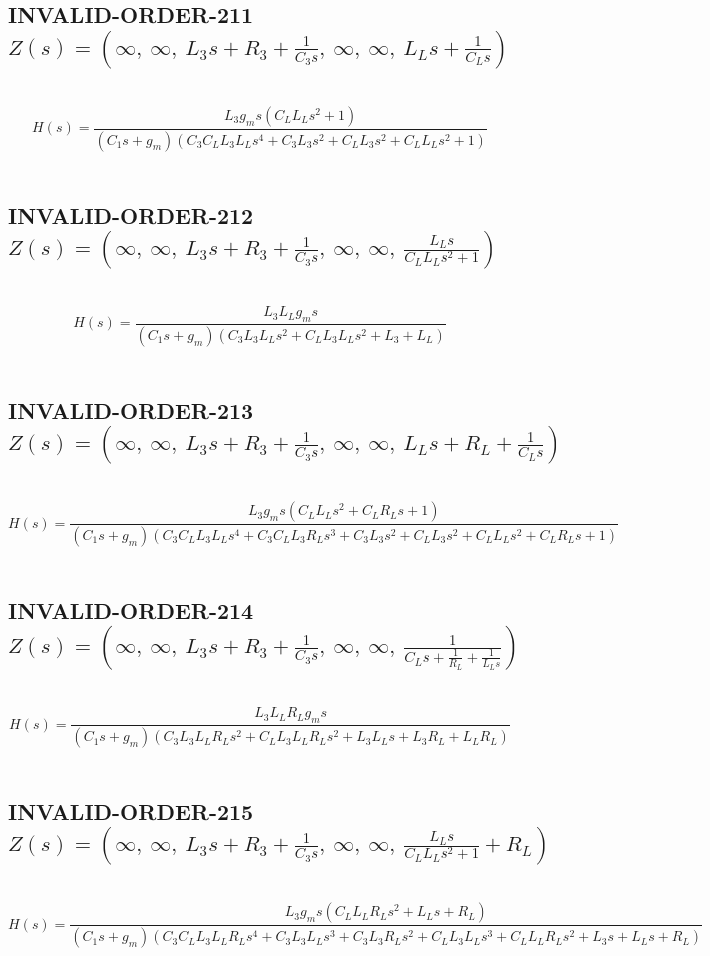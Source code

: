 \documentclass{article}
\begin{document}
\subsection{INVALID-ORDER-211 $Z(s) = \left( \infty, \  \infty, \  L_{3} s + R_{3} + \frac{1}{C_{3} s}, \  \infty, \  \infty, \  L_{L} s + \frac{1}{C_{L} s}\right)$ } \ 
\textbf{\[H(s) = \frac{L_{3} g_{m} s \left(C_{L} L_{L} s^{2} + 1\right)}{\left(C_{1} s + g_{m}\right) \left(C_{3} C_{L} L_{3} L_{L} s^{4} + C_{3} L_{3} s^{2} + C_{L} L_{3} s^{2} + C_{L} L_{L} s^{2} + 1\right)}\] } \ 
\subsection{INVALID-ORDER-212 $Z(s) = \left( \infty, \  \infty, \  L_{3} s + R_{3} + \frac{1}{C_{3} s}, \  \infty, \  \infty, \  \frac{L_{L} s}{C_{L} L_{L} s^{2} + 1}\right)$ } \ 
\textbf{\[H(s) = \frac{L_{3} L_{L} g_{m} s}{\left(C_{1} s + g_{m}\right) \left(C_{3} L_{3} L_{L} s^{2} + C_{L} L_{3} L_{L} s^{2} + L_{3} + L_{L}\right)}\] } \ 
\subsection{INVALID-ORDER-213 $Z(s) = \left( \infty, \  \infty, \  L_{3} s + R_{3} + \frac{1}{C_{3} s}, \  \infty, \  \infty, \  L_{L} s + R_{L} + \frac{1}{C_{L} s}\right)$ } \ 
\textbf{\[H(s) = \frac{L_{3} g_{m} s \left(C_{L} L_{L} s^{2} + C_{L} R_{L} s + 1\right)}{\left(C_{1} s + g_{m}\right) \left(C_{3} C_{L} L_{3} L_{L} s^{4} + C_{3} C_{L} L_{3} R_{L} s^{3} + C_{3} L_{3} s^{2} + C_{L} L_{3} s^{2} + C_{L} L_{L} s^{2} + C_{L} R_{L} s + 1\right)}\] } \ 
\subsection{INVALID-ORDER-214 $Z(s) = \left( \infty, \  \infty, \  L_{3} s + R_{3} + \frac{1}{C_{3} s}, \  \infty, \  \infty, \  \frac{1}{C_{L} s + \frac{1}{R_{L}} + \frac{1}{L_{L} s}}\right)$ } \ 
\textbf{\[H(s) = \frac{L_{3} L_{L} R_{L} g_{m} s}{\left(C_{1} s + g_{m}\right) \left(C_{3} L_{3} L_{L} R_{L} s^{2} + C_{L} L_{3} L_{L} R_{L} s^{2} + L_{3} L_{L} s + L_{3} R_{L} + L_{L} R_{L}\right)}\] } \ 
\subsection{INVALID-ORDER-215 $Z(s) = \left( \infty, \  \infty, \  L_{3} s + R_{3} + \frac{1}{C_{3} s}, \  \infty, \  \infty, \  \frac{L_{L} s}{C_{L} L_{L} s^{2} + 1} + R_{L}\right)$ } \ 
\textbf{\[H(s) = \frac{L_{3} g_{m} s \left(C_{L} L_{L} R_{L} s^{2} + L_{L} s + R_{L}\right)}{\left(C_{1} s + g_{m}\right) \left(C_{3} C_{L} L_{3} L_{L} R_{L} s^{4} + C_{3} L_{3} L_{L} s^{3} + C_{3} L_{3} R_{L} s^{2} + C_{L} L_{3} L_{L} s^{3} + C_{L} L_{L} R_{L} s^{2} + L_{3} s + L_{L} s + R_{L}\right)}\] } \ 
\end{document}
